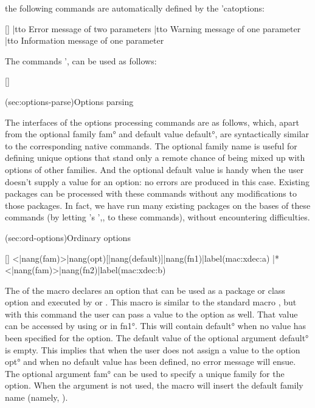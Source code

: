 \documentclass[
  use-a4-paper,
  use-10pt-font,
  final-version,
  use-UK-English,
  fancy-section-headings,
  frame-section-numbers,
  para-abstract-style,
  input-config-file,
  no-hyperref-messages
]{amltxdoc}
\begin{document}
the following commands are automatically defined by the \pkg'{catoptions}:

[\SetStyleFileMessages]
\mypack@error     |tto    Error message of two parameters
\mypack@warning   |tto    Warning message of one parameter
\mypack@info      |tto    Information message of one parameter

The commands \ffx'{\mypack@error,\mypack@info} can be used as follows:

[\SetStyleFileMessages]


\docsection(sec:options-parse){Options parsing}

The interfaces of the options processing commands are as follows, which, apart from the optional family \ang{fam} and default value \ang{default}, are syntactically similar to the corresponding native \latex commands. The optional family name is useful for defining unique options that stand only a remote chance of being mixed up with options of other families. And the optional default value is handy when the user doesn't supply a value for an option: no errors are produced in this case. Existing packages can be processed with these commands without any modifications to those packages. In fact, we have run many existing packages on the bases of these commands (by letting \latex's \hhx'{\DeclareOption,\ExecuteOptions,\ProcessOptions} to these commands), without encountering difficulties.


\docsubsection(sec:ord-options){Ordinary options}

[\XDeclareOption]
\XDeclareOption<|nang(fam)>{|nang(opt)}[|nang(default)]{|nang(fn1)}|label(mac:xdec:a)
\XDeclareOption|*<|nang(fam)>{|nang(fn2)}|label(mac:xdec:b)
\fxim*{\XDeclareOption}

The \unstform of the macro \fx{\XDeclareOption} declares an option that can be used as a package or class option and executed by \fx{\XExecuteOptions} or \fx{\XProcessOptions}. This macro is similar to the standard \latex macro \hx{\DeclareOption}, but with this command the user can pass a value to the option as well. That value can be accessed by using  or \fx{\cpt@currval} in \ang{fn1}. This will contain \ang{default} when no value has been specified for the option. The default value of the optional argument \ang{default} is empty. This implies that when the user does not assign a value to the option \ang{opt} and when no default value has been defined, no error message will ensue. The optional argument \ang{fam} can be used to specify a unique family for the option. When the argument is not used, the macro will insert the default family name (namely, ).
\end{document}
